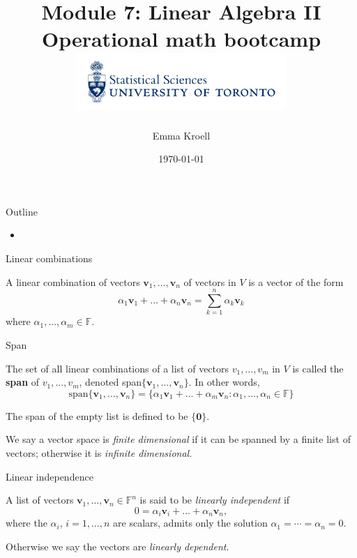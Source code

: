 \documentclass [aspectratio=169]{beamer}
\title[]{Module 7: Linear Algebra II \\ {\large Operational math bootcamp}\\ \includegraphics[width=8cm]{dept_logo.png}\vspace{-1em}}
\author[]{Emma Kroell}
\institute[]{University of Toronto}
\date{\today}
\newcommand{\bv}{{\mathbf{v}}}
\newcommand{\zerovec}{{\mathbf{0}}}
\newcommand{\F}{{\mathbb{F}}}
\begin{document}
{
\begin{frame}
    \titlepage
\end{frame}
}

\begin{frame}{Outline}
    \begin{itemize}
      \setlength\itemsep{1em}
    	\item 
    \end{itemize}
\end{frame}

\begin{frame}{Linear combinations}
\begin{definition}
A linear combination of vectors $\bv_{1},...,\bv_{n}$ of vectors in $V$ is a vector of the form 
$$
\alpha_{1}\bv_{1}+...+\alpha_{n}\bv_{n} = \sum_{k=1}^n \alpha_k \bv_k
$$
 where $\alpha_{1},...,\alpha_{m} \in \F$.
\end{definition}
\end{frame}

\begin{frame}{Span}
\begin{definition}
The set of all linear combinations of a list of vectors
$v_{1},...,v_{m}$ in $V$ is called the \textbf{span} of $v_{1},...,v_{m}$,
denoted span$\{\bv_{1},...,\bv_{n}\}$. In other words, 
$$
\text{span}\{\bv_{1},...,\bv_{n}\}=\{\alpha_{1}\bv_{1}+...+\alpha_{m}\bv_{n} :\alpha_{1},...,\alpha_{n}\in\F\}
$$
\end{definition}
The span of the empty list is defined to be $\{\zerovec\}$.

\vspace{1em}
We say a vector space is \emph{finite dimensional} if it can be spanned by a finite list of vectors; otherwise it is \emph{infinite dimensional}.

\end{frame}


\begin{frame}{Linear independence}
\begin{definition}
A list of vectors $\bv_1, \ldots, \bv_n \in \F^n$ is said to be \emph{linearly independent} if 
$$ 0 = \alpha_i \bv_i + \ldots + \alpha_n \bv_n, $$
where the $\alpha_i$, $i=1,\ldots,n$ are scalars, admits only the solution $\alpha_1 = \cdots = \alpha_n = 0$.
\end{definition}

\vspace{1em} Otherwise we say the vectors are \emph{linearly dependent}.

\end{frame}
\end{document}

